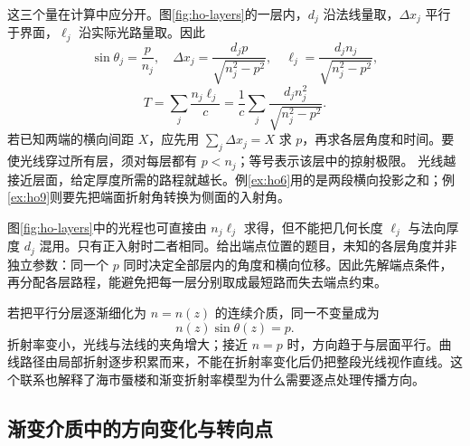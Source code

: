 这三个量在计算中应分开。图\ref{fig:ho-layers}的一层内，$d_j$ 沿法线量取，$\Delta x_j$ 平行于界面，$\ell_j$ 沿实际光路量取。因此
\[
\sin\theta_j=\frac p{n_j},\quad
\Delta x_j=\frac{d_jp}{\sqrt{n_j^2-p^2}},\quad
\ell_j=\frac{d_jn_j}{\sqrt{n_j^2-p^2}},
\]
\[
T=\sum_j\frac{n_j\ell_j}{c}
=\frac1c\sum_j\frac{d_jn_j^2}{\sqrt{n_j^2-p^2}}.
\]
若已知两端的横向间距 $X$，应先用 $\sum_j\Delta x_j=X$ 求 $p$，再求各层角度和时间。要使光线穿过所有层，须对每层都有 $p<n_j$；等号表示该层中的掠射极限。
光线越接近层面，给定厚度所需的路程就越长。例\ref{ex:ho6}用的是两段横向投影之和；例\ref{ex:ho9}则要先把端面折射角转换为侧面的入射角。

图\ref{fig:ho-layers}中的光程也可直接由 $n_j\ell_j$ 求得，但不能把几何长度 $\ell_j$ 与法向厚度 $d_j$ 混用。只有正入射时二者相同。给出端点位置的题目，未知的各层角度并非独立参数：同一个 $p$ 同时决定全部层内的角度和横向位移。因此先解端点条件，再分配各层路程，能避免把每一层分别取成最短路而失去端点约束。

若把平行分层逐渐细化为 $n=n(z)$ 的连续介质，同一不变量成为
\[
 n(z)\sin\theta(z)=p.
\]
折射率变小，光线与法线的夹角增大；接近 $n=p$ 时，方向趋于与层面平行。曲线路径由局部折射逐步积累而来，不能在折射率变化后仍把整段光线视作直线。这个联系也解释了海市蜃楼和渐变折射率模型为什么需要逐点处理传播方向。

\subsection{渐变介质中的方向变化与转向点}

